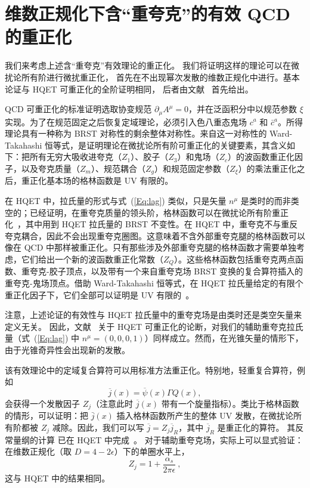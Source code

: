 \section{维数正规化下含“重夸克”的有效 QCD 的重正化}

我们来考虑上述含“重夸克”有效理论的重正化。
我们将证明这样的理论可以在微扰论所有阶进行微扰重正化，
首先在不出现幂次发散的维数正规化中进行。基本论证与 HQET 可重正化的全阶证明相同，
后者由文献~\cite{Bagan:1993zv} 首先给出。

QCD 可重正化的标准证明选取协变规范 $\partial_\mu A^\mu = 0$，并在泛函积分中以规范参数 $\xi$ 实现。为了在规范固定之后恢复定域理论，必须引入色八重态鬼场 $c^a$ 和 $\bar c^a$。所得理论具有一种称为 BRST 对称性的剩余整体对称性。来自这一对称性的 Ward-Takahashi 恒等式，是证明理论在微扰论所有阶可重正化的关键要素，其含义如下：把所有无穷大吸收进夸克（$Z_1$）、胶子（$Z_3$）和鬼场（$Z_c$）的波函数重正化因子，以及夸克质量（$Z_m$）、规范耦合（$Z_g$）和规范固定参数（$Z_\xi$）的乘法重正化之后，重正化基本场的格林函数是 UV 有限的。

在 HQET 中，拉氏量的形式与式~(\ref{Eq:lag}) 类似，只是矢量 $n^\mu$ 是类时的而非类空的；已经证明，在重夸克质量的领头阶，格林函数可以在微扰论所有阶重正化~\cite{Bagan:1993zv}，其中用到 HQET 拉氏量的 BRST 不变性。在 HQET 中，重夸克不与重反夸克耦合，因此不会出现重夸克圈图。这意味着不含外部重夸克腿的格林函数可以像在 QCD 中那样被重正化。只有那些涉及外部重夸克腿的格林函数才需要单独考虑，它们给出一个新的波函数重正化常数（$Z_Q$）。这些格林函数包括重夸克两点函数、重夸克-胶子顶点，以及带有一个来自重夸克场 BRST 变换的复合算符插入的重夸克-鬼场顶点。借助 Ward-Takahashi 恒等式，在 HQET 拉氏量给定的有限个重正化因子下，它们全部可以证明是 UV 有限的~\cite{Bagan:1993zv}。

注意，上述论证的有效性与 HQET 拉氏量中的重夸克场是由类时还是类空矢量来定义无关。
因此，文献~\cite{Bagan:1993zv} 关于 HQET 可重正化的论断，对我们的辅助重夸克拉氏量（式~(\ref{Eq:lag}) 中 $n^\mu=(0,0,0,1)$）同样成立。然而，在光锥矢量的情形下，由于光锥奇异性会出现新的发散。

该有效理论中的定域复合算符可以用标准方法重正化。特别地，轻重复合算符，例如
\begin{equation}
             \overline{j}(x) = \overline{\psi}(x)\Gamma Q(x),
\end{equation}
会获得一个发散因子 $Z_j$（注意此时 $\overline{j}(x)$ 带有一个旋量指标）。类比于格林函数的情形，可以证明：把 $\bar{j}(x)$ 插入格林函数所产生的整体 UV 发散，在微扰论所有阶都被 $Z_j$ 减除。因此，我们可以写 $\overline{j}= Z_j \overline{j}_R$，其中 $\overline{j}_R$
是重正化的算符。
 其反常量纲的计算
已在 HQET 中完成~\cite{Politzer:1988wp,Ji:1991pr}。
对于辅助重夸克场，实际上可以显式验证：在维数正规化（取 $D=4-2\epsilon$）下的单圈水平上，
\begin{equation}\label{eq:hl}
   Z_j = 1+ \frac{\alpha_s}{2\pi\epsilon} \ ,
\end{equation}
这与 HQET 中的结果相同。
